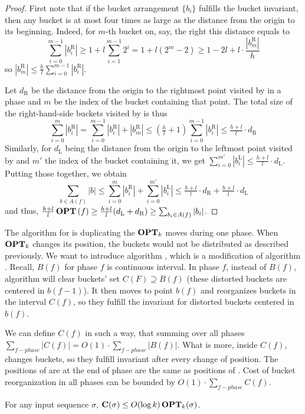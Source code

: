 \begin{proof}
First note that if the bucket arrangement $\{b_i\}$ fulfills the bucket
invariant, then any bucket is at most four times as large as the distance from
the origin to its beginning. Indeed, for $m$-th bucket on, say, the right this
distance equals to
\[ \sum_{i=0}^{m-1}|b_i^\text{R}| \geq 1 +  l\sum_{i=1}^{m-1}2^i = 1+l(2^m-2)
                                  \geq 1 - 2l + l\cdot\frac{|b_m^\text{R}|}h \]
so $|b_m^\text{R}|\leq\frac hl\sum_{i=0}^{m-1}|b_i^\text{R}|$.

Let $d_\text{R}$ be the distance from the origin to the rightmost point visited 
by \opt{} in a phase and $m$ be the index of the bucket containing that point. 
The total size of the right-hand-side buckets visited by \opt{} is thus
\[ \sum_{i=0}^m|b_i^\text{R}| = \sum_{i=0}^{m-1}|b_i^\text{R}|+|b_m^\text{R}|
                           \leq (\tfrac hl + 1)\sum_{i=0}^{m-1}|b_i^\text{R}|
                           \leq \tfrac{h+l}l\cdot d_\text{R} \]
Similarly, for $d_\text{L}$ being the distance from the origin to the leftmost 
point visited by \opt{} and $m'$ the index of the bucket containing it, we get 
$\sum_{i=0}^{m'}|b_i^\text{L}| \leq \tfrac{h+l}l\cdot d_\text{L}$. Putting those
together, we obtain
\[ \sum_{b\in A(f)}|b| \leq \sum_{i=0}^{m}|b_i^\text{R}|
                          + \sum_{i=0}^{m'}|b_i^\text{L}|
                       \leq \tfrac{h+l}l\cdot d_\text{R}
                          + \tfrac{h+l}l\cdot d_\text{L} \]
and thus, $\tfrac{h+l}l\operatorname{\mathbf{OPT}}{}(f)\geq\tfrac{h+l}l(d_\text{L}+d_\text{R})
\geq\sum_{b_i\in A(f)}|b_i|$.
\end{proof}

The algorithm for \fazowy{} is duplicating the $\operatorname{\mathbf{OPT}}_k$ moves during 
one phase. When $\operatorname{\mathbf{OPT}}_k$ changes its position, the buckets would not be 
distributed as described previously. We want to introduce algorithm 
\przesuw, which is a modification of algorithm \fazowy. Recall, $B(f)$ 
for phase $f$ is continuous interval. In phase $f$, instead of $B(f)$, 
algorithm \przesuw{} will clear buckets' set $C(F) \supseteq B(f)$ (these 
distorted buckets are centered in $b(f-1)$). It then moves to point $b(f)$ and 
reorganizes buckets in the interval $C(f)$, so they fulfill the invariant for 
distorted buckets centered in $b(f)$. 

\begin{lemma}
We can define $C(f)$ in such a way, that summing over all phases $\sum_{f - 
phase} |C(f)| = O(1) \cdot \sum_{f - phase} |B(f)|$. What is more, inside 
$C(f)$, \przesuw{} changes buckets, so they fulfill invariant after 
every change of \przesuw{} position. The positions of \przesuw{} are at the end 
of phase are the same as positions of \fazowy. Cost of bucket reorganization 
in all phases can be bounded by $O(1) \cdot \sum_{f-phase} C(f)$.
\end{lemma}

\begin{theorem}
For any input sequence $\sigma$, $\operatorname{\mathbf{C}}(\sigma)\leq O(\log k)\operatorname{\mathbf{OPT}}_k(\sigma)$.
\end{theorem}
